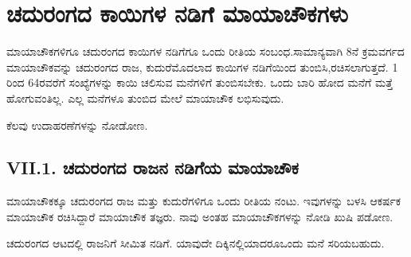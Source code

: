 \chapter{ಚದುರಂಗದ ಕಾಯಿಗಳ ನಡಿಗೆ ಮಾಯಾಚೌಕಗಳು}%

ಮಾಯಾಚೌಕಗಳಿಗೂ ಚದುರಂಗದ ಕಾಯಿಗಳ ನಡಿಗೆಗೂ ಒಂದು ರೀತಿಯ ಸಂಬಂಧ.\break ಸಾಮಾನ್ಯವಾಗಿ 8ನೆ ಕ್ರಮವರ್ಗದ ಮಾಯಾಚೌಕವನ್ನು ಚದುರಂಗದ ರಾಜ, ಕುದುರೆ\break ಮೊದಲಾದ ಕಾಯಿಗಳ ನಡಿಗೆಯಿಂದ ತುಂಬಿಸಿ,ರಚಿಸಲಾಗುತ್ತದೆ. 1 ರಿಂದ 64ರವರೆಗೆ ಸಂಖ್ಯೆ\-ಗಳನ್ನು ಕಾಯಿ ಚಲಿಸುವ ಮನೆಗಳಿಗೆ ತುಂಬಿಸಬೇಕು. ಒಂದು ಬಾರಿ ಹೋದ ಮನೆಗೆ ಮತ್ತೆ ಹೋಗುವಂತಿಲ್ಲ. ಎಲ್ಲ ಮನೆಗಳೂ ತುಂಬಿದ ಮೇಲೆ ಮಾಯಾಚೌಕ ಲಭಿಸುವುದು.

ಕೆಲವು ಉದಾಹರಣೆಗಳನ್ನು ನೋಡೋಣ.

\section*{VII.1. ಚದುರಂಗದ ರಾಜನ ನಡಿಗೆಯ ಮಾಯಾಚೌಕ}

ಮಾಯಾಚೌಕಕ್ಕೂ ಚದುರಂಗದ ರಾಜ ಮತ್ತು ಕುದುರೆಗಳಿಗೂ ಒಂದು ರೀತಿಯ ನಂಟು. ಇವುಗಳನ್ನು ಬಳಸಿ ಆಕರ್ಷಕ ಮಾಯಾಚೌಕ ರಚಿಸಿದ್ದಾರೆ ಮಾಯಾಚೌಕ ತಜ್ಞರು. ನಾವು ಅಂತಹ ಮಾಯಾಚೌಕಗಳನ್ನು ನೋಡಿ ಖುಷಿ ಪಡೋಣ.

ಚದುರಂಗದ ಆಟದಲ್ಲಿ ರಾಜನಿಗೆ ಸೀಮಿತ ನಡಿಗೆ. ಯಾವುದೇ ದಿಕ್ಕಿನಲ್ಲಿಯಾದರೂ\break ಒಂದು ಮನೆ ಸರಿಯಬಹುದು.


